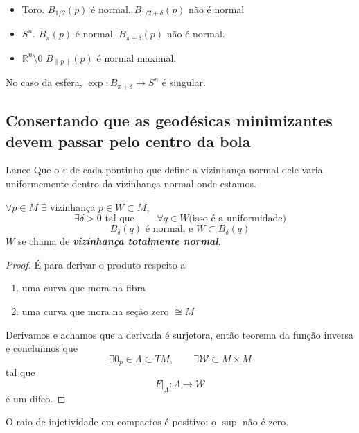 \begin{itemize}
\item Toro. \(B_{1/2}(p)\) é normal. \(B_{1/2 +\delta}(p)\) não é normal
\item \(S^n\). \(B_{\pi}(p)\) é normal. \(B_{\pi+\delta}(p)\) não é normal.
\item  \(\mathbb{R}^n\setminus 0\) \(B_{\|p\|}(p)\) é normal maximal.
\end{itemize}

\begin{remark}\leavevmode
No caso da esfera, \(\operatorname{exp}:B_{\pi+\delta} \to S^n\) é singular.
\end{remark}

\subsection{Consertando que as geodésicas minimizantes devem passar pelo centro da bola}

\begin{thing7}{Lance}\leavevmode
Que o \(\varepsilon\) de cada pontinho que define a vizinhança normal dele varia uniformemente dentro da vizinhança normal onde estamos.
\end{thing7}

\begin{prop}\leavevmode
\(\forall  p \in M\) \(\exists\) vizinhança \(p \in W \subset M\),
\[\exists  \delta>0 \text{ tal que } \qquad  \forall q \in W \text{(isso é  a uniformidade)} \]
\[B_\delta (q)\text{ é normal, e \(W \subset B_\delta(q)\)} \]
\(W\) se chama de \textit{\textbf{vizinhança totalmente normal}}.
\end{prop}

\begin{proof}\leavevmode
É para derivar o produto respeito a 
\begin{enumerate}
\item uma curva que mora na fibra
\item  uma curva que mora na seção zero \(\cong M\) 
\end{enumerate}
Derivamos e achamos que a derivada é surjetora, então teorema da função inversa e concluimos que
\[\exists  0_p \in \Lambda \subset TM,\qquad  \exists  \mathcal{W} \subset M \times M\]
tal que
\[F|_{ \Lambda}: \Lambda \to \mathcal{W}\]
é um difeo.
\end{proof}

\begin{coro}\leavevmode
O raio de injetividade em compactos é positivo: o \(\operatorname{sup}\) não é zero.
\end{coro}

